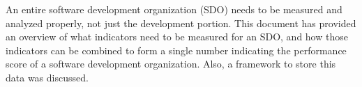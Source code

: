 \documentclass[SDSUThesis.tex]{subfiles}
\begin{document}
An entire software development organization (SDO) needs to be measured and analyzed properly, not just the development portion. This document has provided an overview of what indicators need to be measured for an SDO, and how those indicators can be combined to form a single number indicating the performance score of a software development organization.  Also, a framework to store this data was discussed.
\end{document}
